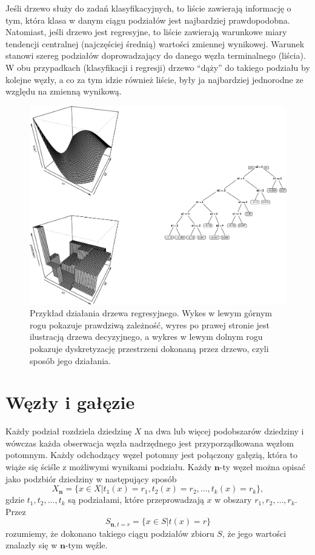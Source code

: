 \documentclass[]{book}
\theoremstyle{plain}
\theoremstyle{definition}
\theoremstyle{definition}
\theoremstyle{definition}
\theoremstyle{definition}
\theoremstyle{remark}
\begin{document}
Jeśli drzewo służy do zadań klasyfikacyjnych, to liście zawierają informację o tym, która klasa w danym ciągu podziałów jest najbardziej prawdopodobna. Natomiast, jeśli drzewo jest regresyjne, to liście zawierają warunkowe miary tendencji centralnej (najczęściej średnią) wartości zmiennej wynikowej. Warunek stanowi szereg podziałów doprowadzający do danego węzła terminalnego (liścia). W obu przypadkach (klasyfikacji i regresji) drzewo ``dąży'' do takiego podziału by kolejne węzły, a co za tym idzie również liście, były ja najbardziej jednorodne ze względu na zmienną wynikową.

\begin{figure}
\centering
\includegraphics{EksploracjaDanych_files/figure-latex/unnamed-chunk-11-1.pdf}
\caption{\label{fig:unnamed-chunk-11}Przykład działania drzewa regresyjnego. Wykes w lewym górnym rogu pokazuje prawdziwą zależność, wyres po prawej stronie jest ilustracją drzewa decyzyjnego, a wykres w lewym dolnym rogu pokazuje dyskretyzację przestrzeni dokonaną przez drzewo, czyli sposób jego działania.}
\end{figure}

\hypertarget{wezy-i-gaezie}{%
\section{Węzły i gałęzie}\label{wezy-i-gaezie}}

Każdy podział rozdziela dziedzinę \(X\) na dwa lub więcej podobszarów dziedziny i wówczas każda obserwacja węzła nadrzędnego jest przyporządkowana węzłom potomnym. Każdy odchodzący węzeł potomny jest połączony gałęzią, która to wiąże się ściśle z możliwymi wynikami podziału. Każdy \(\mathbf{n}\)-ty węzeł można opisać jako podzbiór dziedziny w następujący sposób
\begin{equation}
    X_{\mathbf{n}}=\{x\in X|t_1(x)=r_1,t_2(x)=r_2,\ldots,t_k(x)=r_k\},
\end{equation}
gdzie \(t_1,t_2,\ldots,t_k\) są podziałami, które przeprowadzają \(x\) w obszary \(r_1, r_2,\ldots, r_k\). Przez
\begin{equation}
    S_{\mathbf{n}, t=r}=\{x\in S|t(x)=r\}
\end{equation}
rozumiemy, że dokonano takiego ciągu podziałów zbioru \(S\), że jego wartości znalazły się w \(\mathbf{n}\)-tym węźle.
\end{document}
